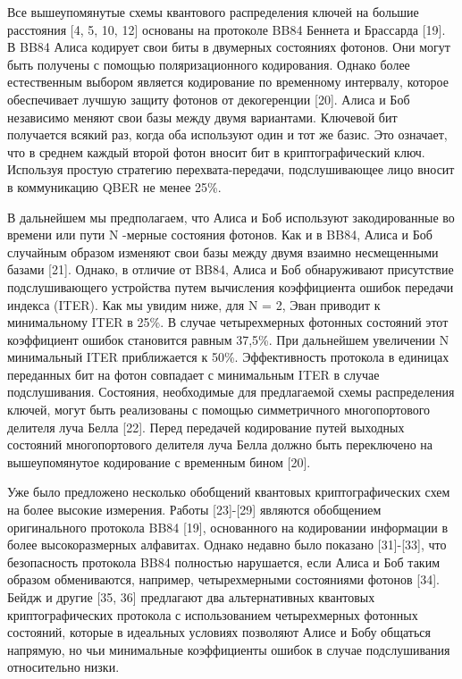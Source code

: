 Все вышеупомянутые схемы квантового распределения ключей на большие расстояния [4, 5, 10, 12] основаны на протоколе BB84 Беннета и Брассарда [19]. В BB84 Алиса кодирует свои биты в двумерных состояниях фотонов. Они могут быть получены с помощью поляризационного кодирования. Однако более естественным выбором является кодирование по временному интервалу, которое обеспечивает лучшую защиту фотонов от декогеренции [20]. Алиса и Боб независимо меняют свои базы между двумя вариантами. Ключевой бит получается всякий раз, когда оба используют один и тот же базис. Это означает, что в среднем каждый второй фотон вносит бит в криптографический ключ. Используя простую стратегию перехвата-передачи, подслушивающее лицо вносит в коммуникацию QBER не менее 25\%.

В дальнейшем мы предполагаем, что Алиса и Боб используют закодированные во времени или пути N -мерные состояния фотонов. Как и в BB84, Алиса и Боб случайным образом изменяют свои базы между двумя взаимно несмещенными базами [21]. Однако, в отличие от BB84, Алиса и Боб обнаруживают присутствие подслушивающего устройства путем вычисления коэффициента ошибок передачи индекса (ITER). Как мы увидим ниже, для N = 2, Эван приводит к минимальному ITER в 25\%. В случае четырехмерных фотонных состояний этот коэффициент ошибок становится равным 37,5\%. При дальнейшем увеличении N минимальный ITER приближается к 50\%. Эффективность протокола в единицах переданных бит на фотон совпадает с минимальным ITER в случае подслушивания. Состояния, необходимые для предлагаемой схемы распределения ключей, могут быть реализованы с помощью симметричного многопортового делителя луча Белла [22]. Перед передачей кодирование путей выходных состояний многопортового делителя луча Белла должно быть переключено на вышеупомянутое кодирование с временным бином [20].

Уже было предложено несколько обобщений квантовых криптографических схем на более высокие измерения. Работы [23]-[29] являются обобщением оригинального протокола BB84 [19], основанного на кодировании информации в более высокоразмерных алфавитах. Однако недавно было показано [31]-[33], что безопасность протокола BB84 полностью нарушается, если Алиса и Боб таким образом обмениваются, например, четырехмерными состояниями фотонов [34]. Бейдж и другие [35, 36] предлагают два альтернативных квантовых криптографических протокола с использованием четырехмерных фотонных состояний, которые в идеальных условиях позволяют Алисе и Бобу общаться напрямую, но чьи минимальные коэффициенты ошибок в случае подслушивания относительно низки.

